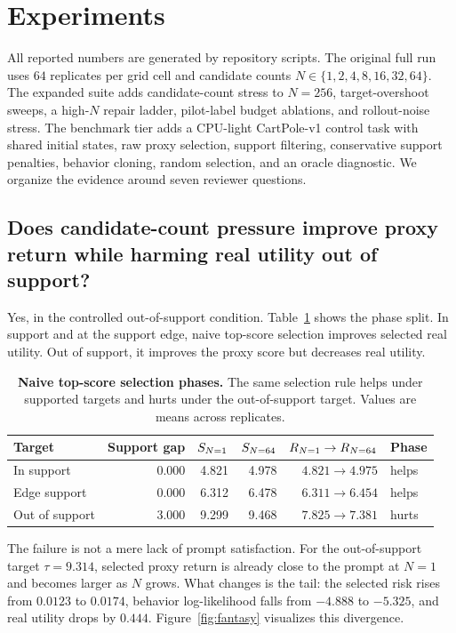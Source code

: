 \section{Experiments}
\label{sec:experiments}

All reported numbers are generated by repository scripts. The original full run uses $64$ replicates per grid cell and candidate counts $N \in \{1,2,4,8,16,32,64\}$. The expanded suite adds candidate-count stress to $N=256$, target-overshoot sweeps, a high-$N$ repair ladder, pilot-label budget ablations, and rollout-noise stress. The benchmark tier adds a CPU-light CartPole-v1 control task with shared initial states, raw proxy selection, support filtering, conservative support penalties, behavior cloning, random selection, and an oracle diagnostic. We organize the evidence around seven reviewer questions.

\subsection{Does candidate-count pressure improve proxy return while harming real utility out of support?}

Yes, in the controlled out-of-support condition. Table~\ref{tab:headline} shows the phase split. In support and at the support edge, naive top-score selection improves selected real utility. Out of support, it improves the proxy score but decreases real utility.

\begin{table}[t]
\centering
\small
\caption{\textbf{Naive top-score selection phases.} The same selection rule helps under supported targets and hurts under the out-of-support target. Values are means across replicates.}
\label{tab:headline}
\begin{tabular}{lrrrrl}
\toprule
Target & Support gap & $S_{N=1}$ & $S_{N=64}$ & $R_{N=1}\rightarrow R_{N=64}$ & Phase \\
\midrule
In support & 0.000 & 4.821 & 4.978 & $4.821 \rightarrow 4.975$ & helps \\
Edge support & 0.000 & 6.312 & 6.478 & $6.311 \rightarrow 6.454$ & helps \\
Out of support & 3.000 & 9.299 & 9.468 & $7.825 \rightarrow 7.381$ & hurts \\
\bottomrule
\end{tabular}
\end{table}

The failure is not a mere lack of prompt satisfaction. For the out-of-support target $\tau=9.314$, selected proxy return is already close to the prompt at $N=1$ and becomes larger as $N$ grows. What changes is the tail: the selected risk rises from $0.0123$ to $0.0174$, behavior log-likelihood falls from $-4.888$ to $-5.325$, and real utility drops by $0.444$. Figure~\ref{fig:fantasy} visualizes this divergence.


